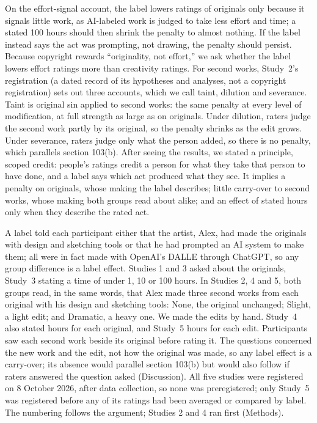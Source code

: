 On the effort-signal account, the label lowers ratings of originals only because it signals little work, as AI-labeled work is judged to take less effort and time;\cite{bellaiche2023humans,horton2023bias,magni2024humans} a stated 100 hours should then shrink the penalty to almost nothing. If the label instead says the act was prompting, not drawing, the penalty should persist. Because copyright rewards ``originality, not effort,''\cite{feist1991rural} we ask whether the label lowers effort ratings more than creativity ratings. For second works, Study~2's registration (a dated record of its hypotheses and analyses, not a copyright registration) sets out three accounts, which we call taint, dilution and severance. Taint is original sin applied to second works: the same penalty at every level of modification, at full strength as large as on originals. Under dilution, raters judge the second work partly by its original, so the penalty shrinks as the edit grows. Under severance, raters judge only what the person added, so there is no penalty, which parallels section 103(b). After seeing the results, we stated a principle, scoped credit: people's ratings credit a person for what they take that person to have done, and a label says which act produced what they see. It implies a penalty on originals, whose making the label describes; little carry-over to second works, whose making both groups read about alike; and an effect of stated hours only when they describe the rated act.

A label told each participant either that the artist, Alex, had made the originals with design and sketching tools or that he had prompted an AI system to make them; all were in fact made with OpenAI's DALL\textperiodcentered E through ChatGPT, so any group difference is a label effect. Studies 1 and 3 asked about the originals, Study~3 stating a time of under 1, 10 or 100 hours. In Studies 2, 4 and 5, both groups read, in the same words, that Alex made three second works from each original with his design and sketching tools: None, the original unchanged; Slight, a light edit; and Dramatic, a heavy one. We made the edits by hand. Study~4 also stated hours for each original, and Study~5 hours for each edit. Participants saw each second work beside its original before rating it. The questions concerned the new work and the edit, not how the original was made, so any label effect is a carry-over; its absence would parallel section 103(b) but would also follow if raters answered the question asked (Discussion). All five studies were registered on 8 October 2026, after data collection, so none was preregistered; only Study~5 was registered before any of its ratings had been averaged or compared by label. The numbering follows the argument; Studies 2 and 4 ran first (Methods).
